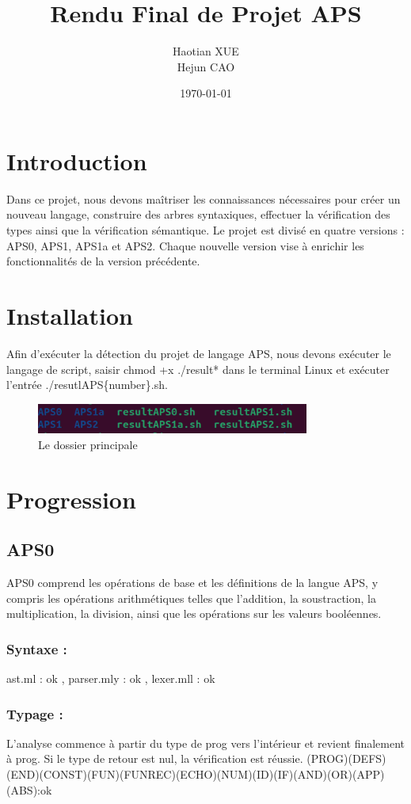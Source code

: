 \documentclass{article}
\title{Rendu Final de Projet APS}
\author{Haotian XUE \\ Hejun CAO}
\date{\today}
\begin{document}
	
	\maketitle
	
	\section{Introduction}
	Dans ce projet, nous devons maîtriser les connaissances nécessaires pour créer un nouveau langage, construire des arbres syntaxiques, effectuer la vérification des types ainsi que la vérification sémantique. Le projet est divisé en quatre versions : APS0, APS1, APS1a et APS2. Chaque nouvelle version vise à enrichir les fonctionnalités de la version précédente.
	
	\section{Installation}
	Afin d'exécuter la détection du projet de langage APS, nous devons exécuter le langage de script, saisir chmod +x ./result* dans le terminal Linux et exécuter l'entrée ./resutlAPS\{number\}.sh.
	\begin{figure}[h]
		\centering
		\includegraphics[width=0.8\textwidth]{./images/installation.png}
		\caption{Le dossier principale}
		\label{fig:exemple1}
	\end{figure}
	
	\section{Progression}
	\subsection*{APS0}
	APS0 comprend les opérations de base et les définitions de la langue APS, y compris les opérations arithmétiques telles que l'addition, la soustraction, la multiplication, la division, ainsi que les opérations sur les valeurs booléennes.

	\subsubsection*{Syntaxe :}
	 	ast.ml : ok , parser.mly : ok , lexer.mll : ok
	
	\subsubsection*{Typage :} 
	L'analyse commence à partir du type de prog vers l'intérieur et revient finalement à prog. Si le type de retour est nul, la vérification est réussie.
	\newline \newline
		(PROG)(DEFS)(END)(CONST)(FUN)(FUNREC)(ECHO)(NUM)(ID)(IF)(AND)(OR)(APP)(ABS):ok
	
\end{document}
